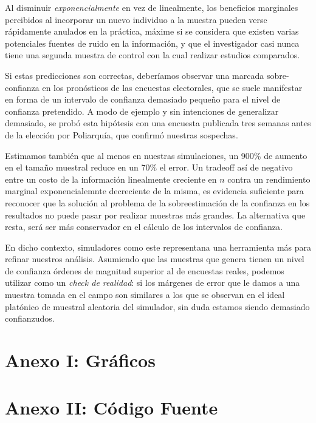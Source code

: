 \documentclass[12pt, a4paper]{article}
\begin{document}
Al disminuir \emph{exponencialmente} en vez de linealmente, los beneficios marginales percibidos al incorporar un nuevo individuo a la muestra pueden verse r\'apidamente anulados en la pr\'actica, m\'axime si se considera que existen varias potenciales fuentes de ruido en la informaci\'on, y que el investigador casi nunca tiene una segunda muestra de control con la cual realizar estudios comparados.  

Si estas predicciones son correctas, deber\'iamos observar una marcada sobre-confianza en los pron\'osticos de las encuestas electorales, que se suele manifestar en forma de un intervalo de confianza demasiado peque\~no para el nivel de confianza pretendido. A modo de ejemplo y sin intenciones de generalizar demasiado, se prob\'o esta hip\'otesis con una encuesta publicada tres semanas antes de la elecci\'on por Poliarqu\'ia, que confirm\'o nuestras sospechas.

Estimamos tambi\'en que al menos en nuestras simulaciones, un 900\% de aumento en el tama\~no muestral reduce en un 70\% el error. Un tradeoff as\'i de negativo entre un costo de la informaci\'on linealmente creciente en $n$ contra un rendimiento marginal exponencialemnte decreciente de la misma, es evidencia suficiente para reconocer que la soluci\'on al problema de la sobreestimaci\'on de la confianza en los resultados no puede pasar por realizar muestras m\'as grandes. La alternativa que resta, ser\'a ser m\'as conservador en el c\'alculo de los intervalos de confianza.

En dicho contexto, simuladores como este representana una herramienta m\'as para refinar nuestros an\'alisis. Asumiendo que las muestras que genera tienen un nivel de confianza \'ordenes de magnitud superior al de encuestas reales, podemos utilizar como un \textit{check de realidad}: si los m\'argenes de error que le damos a una muestra tomada en el campo son similares a los que se observan en el ideal plat\'onico de muestral aleatoria del simulador, sin duda estamos siendo demasiado confianzudos.


\section{Anexo I: Gr\'aficos}







\section{Anexo II: C\'odigo Fuente}
\end{document}
